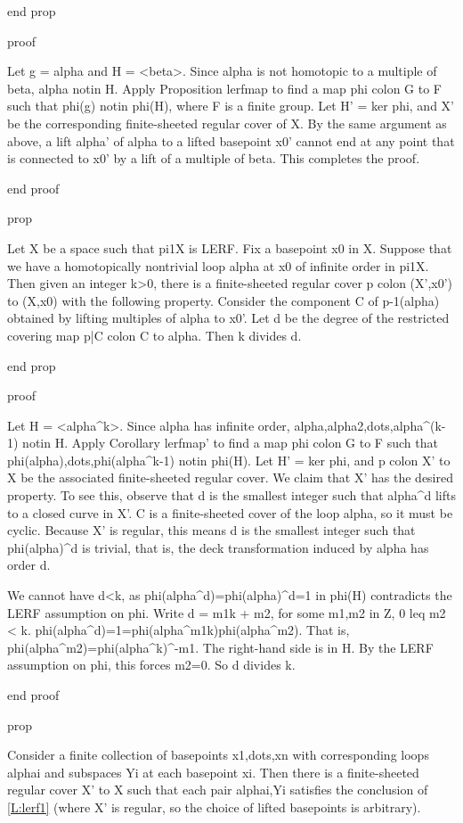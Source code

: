 end prop

proof

Let g = alpha and H = <beta>. Since alpha is not homotopic to a multiple of
beta, alpha notin H. Apply Proposition lerfmap to find a map phi colon G to
F such that phi(g) notin phi(H), where F is a finite group. Let H' = ker phi,
and X' be the corresponding finite-sheeted regular cover of X. By the same
argument as above, a lift alpha' of alpha to a lifted basepoint x0' cannot end
at any point that is connected to x0' by a lift of a multiple of beta. This
completes the proof.

end proof

prop

Let X be a space such that pi1X is LERF. Fix a basepoint x0 in X. Suppose that
we have a homotopically nontrivial loop alpha at x0 of infinite order in pi1X.
Then given an integer k>0, there is a finite-sheeted regular cover p colon
(X',x0') to (X,x0) with the following property. Consider the component C of
p-1(alpha) obtained by lifting multiples of alpha to x0'. Let d be the degree
of the restricted covering map p|C colon C to alpha. Then k divides d.

end prop

proof

Let H = <alpha^k>. Since alpha has infinite order,
alpha,alpha2,dots,alpha^(k-1) notin H. Apply Corollary lerfmap' to find a map
phi colon G to F such that phi(alpha),dots,phi(alpha^k-1) notin phi(H). Let H'
= ker phi, and p colon X' to X be the associated finite-sheeted regular cover.
We claim that X' has the desired property. To see this, observe that d is the
smallest integer such that alpha^d lifts to a closed curve in X'. C is
a finite-sheeted cover of the loop alpha, so it must be cyclic. Because X' is
regular, this means d is the smallest integer such that phi(alpha)^d is
trivial, that is, the deck transformation induced by alpha has order d.

We cannot have d<k, as phi(alpha^d)=phi(alpha)^d=1 in phi(H) contradicts the
LERF assumption on phi. Write d = m1k + m2, for some m1,m2 in Z, 0 leq m2 < k.
phi(alpha^d)=1=phi(alpha^m1k)phi(alpha^m2). That is,
phi(alpha^m2)=phi(alpha^k)^-m1. The right-hand side is in H. By the LERF
assumption on phi, this forces m2=0. So d divides k.

end proof

prop

Consider a finite collection of basepoints x1,dots,xn with corresponding loops
alphai and subspaces Yi at each basepoint xi. Then there is a finite-sheeted
regular cover X' to X such that each pair alphai,Yi satisfies the conclusion of
\ref{L:lerf1} (where X' is regular, so the choice of lifted basepoints is
arbitrary).

